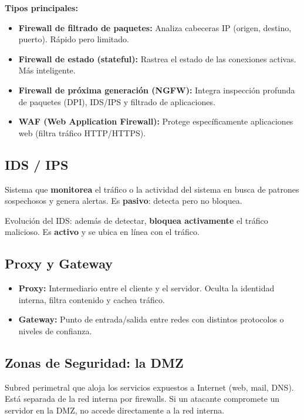 \documentclass[11pt,a4paper]{article}
\begin{document}
\textbf{Tipos principales:}
\begin{itemize}[leftmargin=*]
  \item \textbf{Firewall de filtrado de paquetes:} Analiza cabeceras IP (origen, destino, puerto). Rápido pero limitado.
  \item \textbf{Firewall de estado (stateful):} Rastrea el estado de las conexiones activas. Más inteligente.
  \item \textbf{Firewall de próxima generación (NGFW):} Integra inspección profunda de paquetes (DPI), IDS/IPS y filtrado de aplicaciones.
  \item \textbf{WAF (Web Application Firewall):} Protege específicamente aplicaciones web (filtra tráfico HTTP/HTTPS).
\end{itemize}

\subsection{IDS / IPS}
\begin{definicion}
Sistema que \textbf{monitorea} el tráfico o la actividad del sistema en busca de patrones sospechosos y genera alertas. Es \textbf{pasivo}: detecta pero no bloquea.
\end{definicion}

\begin{definicion}
Evolución del IDS: además de detectar, \textbf{bloquea activamente} el tráfico malicioso. Es \textbf{activo} y se ubica en línea con el tráfico.
\end{definicion}

\subsection{Proxy y Gateway}
\begin{itemize}[leftmargin=*]
  \item \textbf{Proxy:} Intermediario entre el cliente y el servidor. Oculta la identidad interna, filtra contenido y cachea tráfico.
  \item \textbf{Gateway:} Punto de entrada/salida entre redes con distintos protocolos o niveles de confianza.
\end{itemize}

\subsection{Zonas de Seguridad: la DMZ}
\begin{definicion}
Subred perimetral que aloja los servicios expuestos a Internet (web, mail, DNS). Está separada de la red interna por firewalls. Si un atacante compromete un servidor en la DMZ, no accede directamente a la red interna.
\end{definicion}
\end{document}
